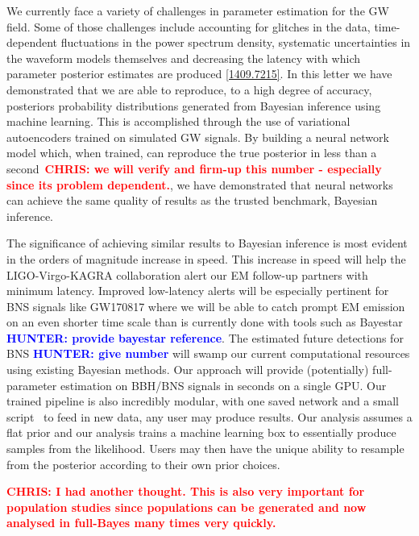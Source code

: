 \documentclass[%
showpacs,
 amsmath,amssymb,
 aps,
 twocolumn,
 prl,
 reprint,
floatfix,
]{revtex4-1}
\newcommand{\chris}[1]{\textbf{\textcolor{red}{CHRIS: #1}}}
\newcommand{\hunter}[1]{\textbf{\textcolor{blue}{HUNTER: #1}}}
\begin{document}
%
%
We currently face a variety of challenges in 
parameter estimation for the \ac{GW} field. Some of those 
challenges include accounting for glitches in the data, time-dependent 
fluctuations in the power spectrum density, systematic uncertainties 
in the waveform models themselves and decreasing the latency with 
which parameter posterior estimates are produced \ref{1409.7215}. 
In this letter we have demonstrated that we are able to
reproduce, to a high degree of accuracy, posteriors probability distributions generated from Bayesian
inference using machine learning. This is accomplished through the use of
variational autoencoders trained on simulated \ac{GW} signals. By building a neural network model which,
when trained, can reproduce the true posterior in less than a second~\chris{we
will verify and firm-up this number - especially since its problem dependent.},
we have demonstrated that neural networks can achieve the same 
quality of results as the trusted
benchmark, Bayesian inference.

%
%
The significance of achieving similar results
to Bayesian inference is most evident in the orders of magnitude increase in speed. This increase in speed will help the
LIGO-Virgo-KAGRA collaboration alert our \ac{EM} follow-up partners with
minimum latency. Improved low-latency alerts will be especially 
pertinent for \ac{BNS} signals like GW170817 where we will be able 
to catch prompt \ac{EM} emission on an even shorter time scale than 
is currently done with tools such as Bayestar \hunter{provide bayestar 
reference}. The estimated future detections for \ac{BNS} \hunter{ 
give number} will swamp our current computational resources using 
existing Bayesian methods. Our approach will provide (potentially) 
full-parameter estimation on \ac{BBH}/{\ac{BNS}} signals in seconds 
on a single GPU. Our trained pipeline is also incredibly modular, with 
one saved network and a small script~ to feed in new data, 
any user may produce results. Our analysis assumes a flat prior and our 
analysis trains a machine learning box to essentially produce samples 
from the likelihood. Users may then have the unique ability to 
resample from the posterior according to their own prior choices.  

\chris{I had another thought. This is also very important for population
studies since populations can be generated and now analysed in full-Bayes many
times very quickly.}
\end{document}
